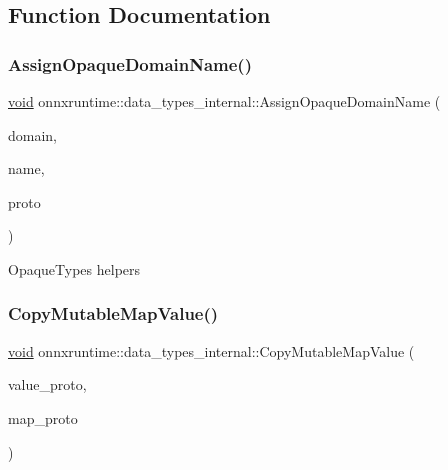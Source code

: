 \subsection{Function Documentation}
\mbox{\label{namespaceonnxruntime_1_1data__types__internal_a032f5531fe029539cd81b7bb954d3f47}} 
\subsubsection{\texorpdfstring{Assign\+Opaque\+Domain\+Name()}{AssignOpaqueDomainName()}}
{\footnotesize\ttfamily \mbox{\hyperlink{mlasi_8h_a88f941d423cb2a819b70a1358982b1a6}{void}} onnxruntime\+::data\+\_\+types\+\_\+internal\+::\+Assign\+Opaque\+Domain\+Name (\begin{DoxyParamCaption}\item[{const char $\ast$}]{domain,  }\item[{const char $\ast$}]{name,  }\item[{O\+N\+N\+X\+\_\+\+N\+A\+M\+E\+S\+P\+A\+C\+E\+::\+Type\+Proto \&}]{proto }\end{DoxyParamCaption})}

Opaque\+Types helpers \mbox{\label{namespaceonnxruntime_1_1data__types__internal_ac1fd254086666e3c4b5a446f675045c2}} 
\subsubsection{\texorpdfstring{Copy\+Mutable\+Map\+Value()}{CopyMutableMapValue()}}
{\footnotesize\ttfamily \mbox{\hyperlink{mlasi_8h_a88f941d423cb2a819b70a1358982b1a6}{void}} onnxruntime\+::data\+\_\+types\+\_\+internal\+::\+Copy\+Mutable\+Map\+Value (\begin{DoxyParamCaption}\item[{const O\+N\+N\+X\+\_\+\+N\+A\+M\+E\+S\+P\+A\+C\+E\+::\+Type\+Proto \&}]{value\+\_\+proto,  }\item[{O\+N\+N\+X\+\_\+\+N\+A\+M\+E\+S\+P\+A\+C\+E\+::\+Type\+Proto \&}]{map\+\_\+proto }\end{DoxyParamCaption})}

